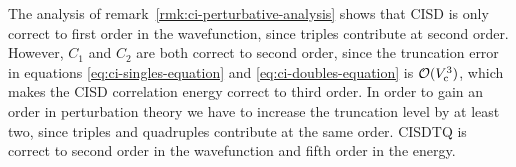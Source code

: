 \documentclass[11pt]{article}
\numberwithin{equation}{section}
\begin{document}
\begin{ex}
\label{ex:analysis-of-cisd-throuh-q}
The analysis of remark~\ref{rmk:ci-perturbative-analysis} shows that CISD is only correct to first order in the wavefunction, since triples contribute at second order.
However, $C_1$ and $C_2$ are both correct to second order, since the truncation error in equations \ref{eq:ci-singles-equation} and \ref{eq:ci-doubles-equation} is $\mathcal{O}(V_{\mathrm{c}}^3)$, which makes the CISD correlation energy correct to third order.
In order to gain an order in perturbation theory we have to increase the truncation level by at least two, since triples and quadruples contribute at the same order.
CISDTQ is correct to second order in the wavefunction and fifth order in the energy.
\end{ex}

\begin{prop}
\label{prop:ci-orders}
\end{prop}
\end{document}
